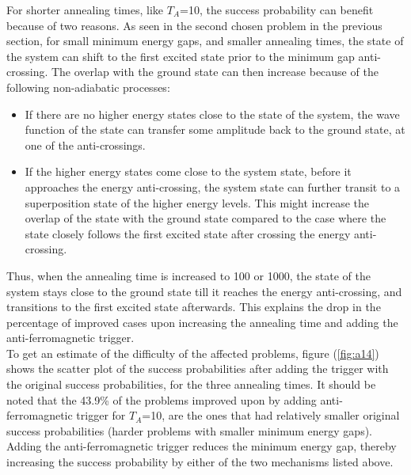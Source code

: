 \documentclass[../main.tex]{subfiles}
\begin{document}
For shorter annealing times, like $T_A$=10, the success probability can benefit because of two reasons. As seen in the second chosen problem in the previous section, for small minimum energy gaps, and smaller annealing times, the state of the system can shift to the first excited state prior to the minimum gap anti-crossing. The overlap with the ground state can then increase because of the following non-adiabatic processes:
\begin{itemize}
\item If there are no higher energy states close to the state of the system, the wave function of the state can transfer some amplitude back to the ground state, at one of the anti-crossings.
\item If the higher energy states come close to the system state, before it approaches the energy anti-crossing, the system state can further transit to a superposition state of the higher energy levels. This might increase the overlap of the state with the ground state compared to the case where the state closely follows the first excited state after crossing the energy anti-crossing.
\end{itemize}

Thus, when the annealing time is increased to 100 or 1000, the state of the system stays close to the ground state till it reaches the energy anti-crossing, and transitions to the first excited state afterwards. This explains the drop in the percentage of improved cases upon increasing the annealing time and adding the anti-ferromagnetic trigger. \\

To get an estimate of the difficulty of the affected problems, figure (\ref{fig:a14}) shows the scatter plot of the success probabilities after adding the trigger with the original success probabilities, for the three annealing times. It should be noted that the 43.9\% of the problems improved upon by adding anti-ferromagnetic trigger for $T_A$=10, are the ones that had relatively smaller original success probabilities (harder problems with smaller minimum energy gaps). Adding the anti-ferromagnetic trigger reduces the minimum energy gap, thereby increasing the success probability by either of the two mechanisms listed above.
\end{document}
